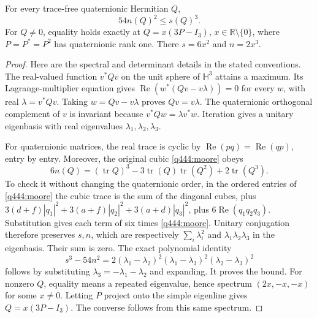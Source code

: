 \begin{lemma}\label{q444:sharp}
For every trace-free quaternionic Hermitian $Q$,
\[
 54n(Q)^2\leq s(Q)^3.
\]
For $Q\ne0$, equality holds exactly at
$Q=x(3P-I_3)$, $x\in\mathbb R\setminus\{0\}$, where
$P=P^*=P^2$ has quaternionic rank one. There
$s=6x^2$ and $n=2x^3$.
\end{lemma}
\begin{proof}
Here are the spectral and determinant details in the stated conventions.
The real-valued function $v^*Qv$ on the unit sphere of $\mathbb H^3$
attains a maximum. Its Lagrange-multiplier equation gives
$\operatorname{Re}(w^*(Qv-v\lambda))=0$ for every $w$, with real
$\lambda=v^*Qv$. Taking $w=Qv-v\lambda$ proves $Qv=v\lambda$.
The quaternionic orthogonal complement of $v$ is invariant because
$v^*Qw=\lambda v^*w$. Iteration gives a unitary eigenbasis with real
eigenvalues $\lambda_1,\lambda_2,\lambda_3$.

For quaternionic matrices, the real trace is cyclic by
$\operatorname{Re}(pq)=\operatorname{Re}(qp)$, entry by entry. Moreover,
the original cubic \eqref{q444:moore} obeys
\begin{equation}\label{q444:newton-cubic}
 6n(Q)=(\operatorname{tr}Q)^3
       -3\operatorname{tr}(Q)\operatorname{tr}(Q^2)
       +2\operatorname{tr}(Q^3).
\end{equation}
To check it without changing the quaternionic order, in the ordered
entries of \eqref{q444:moore} the cubic trace is the sum of the diagonal
cubes, plus $3(d+f)|q_1|^2+3(a+f)|q_2|^2+3(a+d)|q_3|^2$,
plus $6\operatorname{Re}(q_1q_2q_3)$. Substitution gives each term of
six times \eqref{q444:moore}. Unitary conjugation therefore preserves
$s,n$, which are respectively $\sum_i\lambda_i^2$ and
$\lambda_1\lambda_2\lambda_3$ in the eigenbasis. Their sum is zero.
The exact polynomial identity
\[
 s^3-54n^2=2(\lambda_1-\lambda_2)^2
                (\lambda_1-\lambda_3)^2(\lambda_2-\lambda_3)^2
\]
follows by substituting $\lambda_3=-\lambda_1-\lambda_2$ and expanding.
It proves the bound. For nonzero $Q$, equality means a repeated
eigenvalue, hence spectrum $(2x,-x,-x)$ for some $x\ne0$.
Letting $P$ project onto the simple eigenline gives $Q=x(3P-I_3)$.
The converse follows from this same spectrum.
\end{proof}

